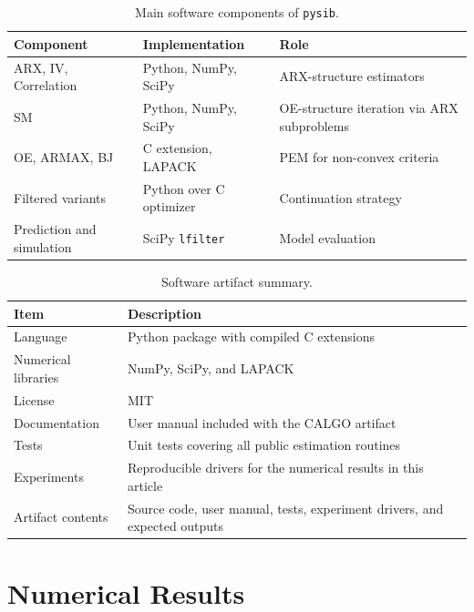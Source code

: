 \documentclass[acmsmall,screen,review]{acmart}
\begin{document}
\begin{table}[t]
    \caption{Main software components of \texttt{pysib}.}
    \label{tab:architecture}
    \centering
    \footnotesize
    \setlength{\tabcolsep}{3pt}
    \begin{tabular}{p{}p{}p{}}
        \toprule
        Component & Implementation & Role \\
        \midrule
        ARX, IV, Correlation & Python, NumPy, SciPy & ARX-structure estimators \\
        SM & Python, NumPy, SciPy & OE-structure iteration via ARX subproblems \\
        OE, ARMAX, BJ & C extension, LAPACK & PEM for non-convex criteria \\
        Filtered variants & Python over C optimizer & Continuation strategy \\
        Prediction and simulation & SciPy \texttt{lfilter} & Model evaluation \\
        \bottomrule
    \end{tabular}
\end{table}

\begin{table}[t]
    \caption{Software artifact summary.}
    \label{tab:artifact}
    \centering
    \footnotesize
    \setlength{\tabcolsep}{4pt}
    \begin{tabular}{p{}p{}}
        \toprule
        Item & Description \\
        \midrule
        Language & Python package with compiled C extensions \\
        Numerical libraries & NumPy, SciPy, and LAPACK \\
        License & MIT \\
        Documentation & User manual included with the CALGO artifact \\
        Tests & Unit tests covering all public estimation routines \\
        Experiments & Reproducible drivers for the numerical results in this article \\
        Artifact contents & Source code, user manual, tests, experiment drivers, and expected outputs \\
        \bottomrule
    \end{tabular}
\end{table}

\section{Numerical Results}
\label{sec:numerical-results}
\end{document}
